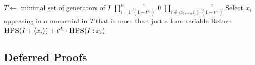\documentclass[11pt,reqno]{amsart}
\newcommand{\suchthat}{:}
\newcommand{\ideal}[1]{\left\langle#1\right\rangle}
\theoremstyle{definition}
\numberwithin{equation}{section}
\begin{document}
\begin{algorithm}[H]
\caption{Algorithm to compute $H_{R[X_1, \ldots, X_n], I}$ when $I$ is a monomial ideal, where $\deg(X_i) = d_i$ for all $i$}
\label{alg:hilbert-clo}
\begin{algorithmic}[1]
\medskip
{}
\State $T \gets$ minimal set of generators of $I$
\State \Return $\prod_{i=1}^{n}\frac{1}{(1-t^{d_i})}$ \label{alg:hps:line:degree1-trivial}
\State \Return $0$
\State \Return $\prod_{i \notin \{i_1, \dotsc, i_p\}} \frac{1}{(1-t^{d_i})}$ \label{alg:hps:line:degree1}
\Else
\State Select $x_i$ appearing in a monomial in $T$ that is more than just a lone variable \label{alg:hps:line:select-branching-variable}
\State Return $\textsc{HPS}(I + \ideal{x_i}) + t^{d_i} \cdot\textsc{HPS}(I \suchthat x_i)$ \label{alg:hps:line-recursion}
\EndIf
\EndProcedure
\end{algorithmic}
\end{algorithm}

\subsection{Deferred Proofs}
\label{sec:app:dimension}

\end{document}
